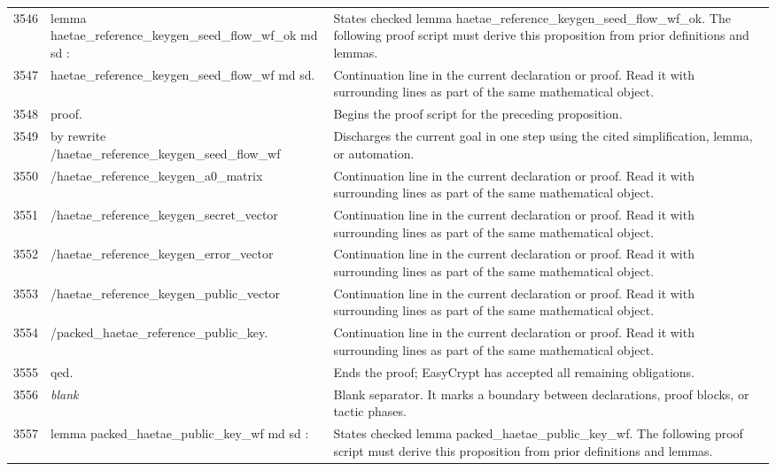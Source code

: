 \documentclass[10pt]{article}
\begin{document}
\begin{longtable}{r L{0.53\textwidth} L{0.37\textwidth}}
3546 & {\ttfamily\scriptsize lemma haetae\_reference\_keygen\_seed\_flow\_wf\_ok md sd :} & States checked lemma haetae\_reference\_keygen\_seed\_flow\_wf\_ok.  The following proof script must derive this proposition from prior definitions and lemmas. \\
3547 & {\ttfamily\scriptsize   haetae\_reference\_keygen\_seed\_flow\_wf md sd.} & Continuation line in the current declaration or proof.  Read it with surrounding lines as part of the same mathematical object. \\
3548 & {\ttfamily\scriptsize proof.} & Begins the proof script for the preceding proposition. \\
3549 & {\ttfamily\scriptsize by rewrite /haetae\_reference\_keygen\_seed\_flow\_wf} & Discharges the current goal in one step using the cited simplification, lemma, or automation. \\
3550 & {\ttfamily\scriptsize            /haetae\_reference\_keygen\_a0\_matrix} & Continuation line in the current declaration or proof.  Read it with surrounding lines as part of the same mathematical object. \\
3551 & {\ttfamily\scriptsize            /haetae\_reference\_keygen\_secret\_vector} & Continuation line in the current declaration or proof.  Read it with surrounding lines as part of the same mathematical object. \\
3552 & {\ttfamily\scriptsize            /haetae\_reference\_keygen\_error\_vector} & Continuation line in the current declaration or proof.  Read it with surrounding lines as part of the same mathematical object. \\
3553 & {\ttfamily\scriptsize            /haetae\_reference\_keygen\_public\_vector} & Continuation line in the current declaration or proof.  Read it with surrounding lines as part of the same mathematical object. \\
3554 & {\ttfamily\scriptsize            /packed\_haetae\_reference\_public\_key.} & Continuation line in the current declaration or proof.  Read it with surrounding lines as part of the same mathematical object. \\
3555 & {\ttfamily\scriptsize qed.} & Ends the proof; EasyCrypt has accepted all remaining obligations. \\
3556 & {\ttfamily\scriptsize \emph{blank}} & Blank separator.  It marks a boundary between declarations, proof blocks, or tactic phases. \\
3557 & {\ttfamily\scriptsize lemma packed\_haetae\_public\_key\_wf md sd :} & States checked lemma packed\_haetae\_public\_key\_wf.  The following proof script must derive this proposition from prior definitions and lemmas. \\

\end{longtable}
\end{document}
